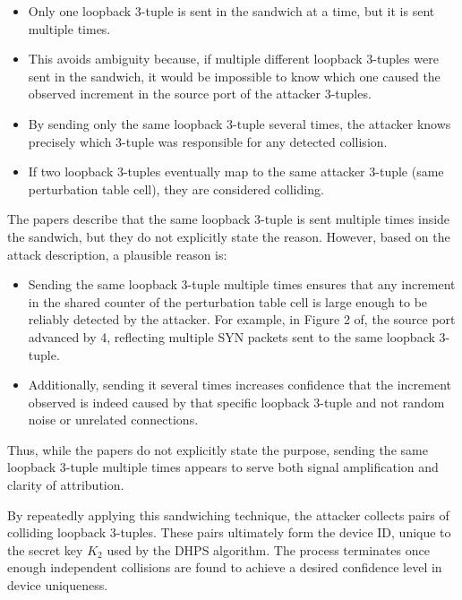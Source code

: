 \documentclass{report}
\begin{document}
\begin{itemize}
	\item Only one loopback 3-tuple is sent in the sandwich at a time, but it is sent multiple times.
	\item This avoids ambiguity because, if multiple different loopback 3-tuples were sent in the sandwich, it would be impossible to know which one caused the observed increment in the source port of the attacker 3-tuples.
	\item By sending only the same loopback 3-tuple several times, the attacker knows precisely which 3-tuple was responsible for any detected collision.
	\item If two loopback 3-tuples eventually map to the same attacker 3-tuple (same perturbation table cell), they are considered colliding.
\end{itemize}

The papers describe that the same loopback 3-tuple is sent multiple times inside the sandwich, but they do not explicitly state the reason. However, based on the attack description, a plausible reason is:

\begin{itemize}
	\item Sending the same loopback 3-tuple multiple times ensures that any increment in the shared counter of the perturbation table cell is large enough to be reliably detected by the attacker. For example, in Figure 2 of, the source port advanced by 4, reflecting multiple SYN packets sent to the same loopback 3-tuple.
	\item Additionally, sending it several times increases confidence that the increment observed is indeed caused by that specific loopback 3-tuple and not random noise or unrelated connections.
\end{itemize}

Thus, while the papers do not explicitly state the purpose, sending the same loopback 3-tuple multiple times appears to serve both signal amplification and clarity of attribution.

By repeatedly applying this sandwiching technique, the attacker collects pairs of colliding loopback 3-tuples. These pairs ultimately form the device ID, unique to the secret key $K_2$ used by the DHPS algorithm. The process terminates once enough independent collisions are found to achieve a desired confidence level in device uniqueness.

\begin{center}
	\begin{minipage}[t]{0.5\textwidth}
		\vspace{0cm}

		
	\end{minipage}
\end{center}
\end{document}
